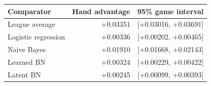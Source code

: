 \begin{tabular}{lrr}
\toprule
Comparator & Hand advantage & 95\% game interval\\
\midrule
League average & +0.03351 & [+0.03016, +0.03691]\\
Logistic regression & +0.00336 & [+0.00202, +0.00465]\\
Naive Bayes & +0.01910 & [+0.01668, +0.02143]\\
Learned BN & +0.00324 & [+0.00229, +0.00422]\\
Latent BN & +0.00245 & [+0.00099, +0.00393]\\
\bottomrule
\end{tabular}
